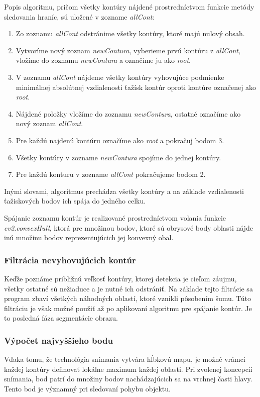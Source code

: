 Popis algoritmu, pričom všetky kontúry nájdené prostredníctvom funkcie metódy sledovania hraníc, sú uložené v zozname \textit{allCont}:
\begin{enumerate}
  \item Zo zoznamu \textit{allCont} odstránime všetky kontúry, ktoré majú nulový obsah.
  \item Vytvoríme nový zoznam \textit{newContura}, vyberieme prvú kontúru z \textit{allCont}, vložíme do zoznamu \textit{newContura} a označíme ju ako \textit{root}.
  \item V zoznamu \textit{allCont} nájdeme všetky kontúry vyhovujúce podmienke minimálnej absolútnej vzdialenosti ťažísk kontúr oproti kontúre označenej ako \textit{root}.
  \item Nájdené položky vložíme do zoznamu \textit{newContura}, ostatné označíme ako nový zoznam
  \textit{allCont}.
  \item Pre každú najdenú kontúru označíme ako \textit{root} a  pokračuj bodom 3.
  \item Všetky kontúry v zozname \textit{newContura} spojíme do jednej kontúry.
  \item Pre každú konturu v zozname \textit{allCont} pokračujeme bodom 2.
  
\end{enumerate}
Inými slovami, algoritmus prechádza všetky kontúry a na základe vzdialenosti ťažiskových bodov ich spája do jedného celku.


Spájanie zoznamu kontúr je realizované prostredníctvom volania funkcie \textit{cv2.convexHull}, ktorá pre množinou bodov, ktoré sú obrysové body oblasti nájde inú množinu bodov reprezentujúcich jej konvexný obal.

\subsubsection{Filtrácia nevyhovujúcich kontúr}  
Keďže poznáme približnú veľkosť kontúry, ktorej detekcia je cieľom záujmu, všetky ostatné sú nežiaduce a je nutné ich odstrániť. Na základe tejto filtrácie sa program zbaví všetkých náhodných oblastí, ktoré vznikli pôsobením šumu. Túto filtráciu je však možné použiť až po aplikovaní algoritmu pre spájanie kontúr. Je to posledná fáza segmentácie obrazu. 

\subsubsection{Výpočet najvyššieho bodu}
Vďaka tomu, že technológia snímania vytvára hĺbkovú mapu, je možné vrámci každej kontúry definovať lokálne maximum každej oblasti. Pri zvolenej koncepcií snímania, bod patrí do množiny bodov nachádzajúcich sa na vrchnej časti hlavy. Tento bod je významný pri sledovaní pohybu objektu. \vspace{5mm}


